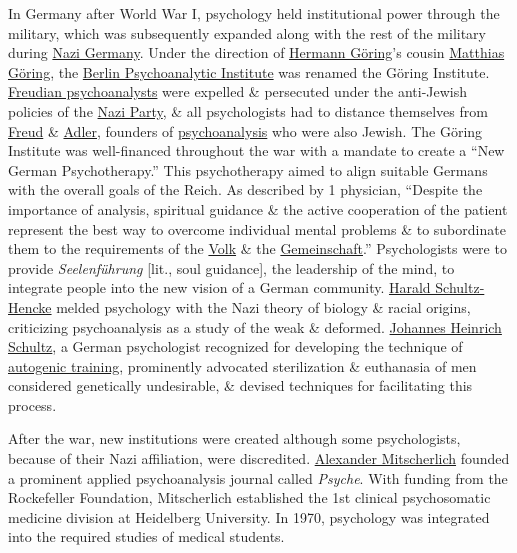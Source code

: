 \documentclass[oneside]{book}
\numberwithin{equation}{section}
\begin{document}
In Germany after World War I, psychology held institutional power through the military, which was subsequently expanded along with the rest of the military during \href{https://en.wikipedia.org/wiki/Nazi_Germany}{Nazi Germany}. Under the direction of \href{https://en.wikipedia.org/wiki/Hermann_G%C3%B6ring}{Hermann G\"oring}'s cousin \href{https://en.wikipedia.org/wiki/Matthias_G%C3%B6ring}{Matthias G\"oring}, the \href{https://en.wikipedia.org/wiki/Berlin_Psychoanalytic_Institute}{Berlin Psychoanalytic Institute} was renamed the G\"oring Institute. \href{https://en.wikipedia.org/wiki/Freudian_psychoanalysis}{Freudian psychoanalysts} were expelled \& persecuted under the anti-Jewish policies of the \href{https://en.wikipedia.org/wiki/Nazi_Party}{Nazi Party}, \& all psychologists had to distance themselves from \href{https://en.wikipedia.org/wiki/Sigmund_Freud}{Freud} \& \href{https://en.wikipedia.org/wiki/Alfred_Adler}{Adler}, founders of \href{https://en.wikipedia.org/wiki/Psychoanalysis}{psychoanalysis} who were also Jewish. The G\"oring Institute was well-financed throughout the war with a mandate to create a ``New German Psychotherapy.'' This psychotherapy aimed to align suitable Germans with the overall goals of the Reich. As described by 1 physician, ``Despite the importance of analysis, spiritual guidance \& the active cooperation of the patient represent the best way to overcome individual mental problems \& to subordinate them to the requirements of the \href{https://en.wikipedia.org/wiki/Volk}{Volk} \& the \href{https://en.wikipedia.org/wiki/Gemeinschaft_and_Gesellschaft}{Gemeinschaft}.'' Psychologists were to provide \textit{Seelenf\"uhrung} [lit., soul guidance], the leadership of the mind, to integrate people into the new vision of a German community. \href{https://en.wikipedia.org/wiki/Harald_Schultz-Hencke}{Harald Schultz-Hencke} melded psychology with the Nazi theory of biology \& racial origins, criticizing psychoanalysis as a study of the weak \& deformed. \href{https://en.wikipedia.org/wiki/Johannes_Heinrich_Schultz}{Johannes Heinrich Schultz}, a German psychologist recognized for developing the technique of \href{https://en.wikipedia.org/wiki/Autogenic_training}{autogenic training}, prominently advocated sterilization \& euthanasia of men considered genetically undesirable, \& devised techniques for facilitating this process.

After the war, new institutions were created although some psychologists, because of their Nazi affiliation, were discredited. \href{https://en.wikipedia.org/wiki/Alexander_Mitscherlich_(psychologist)}{Alexander Mitscherlich} founded a prominent applied psychoanalysis journal called \textit{Psyche}. With funding from the Rockefeller Foundation, Mitscherlich established the 1st clinical psychosomatic medicine division at Heidelberg University. In 1970, psychology was integrated into the required studies of medical students.
\end{document}
